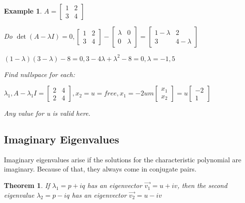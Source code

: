 \documentclass{article}
\newtheorem{theorem}{Theorem}
\newtheorem{example}{Example}
\begin{document}
\begin{example}
	$A=\begin{bmatrix}1&2\\3&4\end{bmatrix}$

	Do $\det(A-\lambda I)=0, \begin{bmatrix}1&2\\3&4\end{bmatrix}-\begin{bmatrix}\lambda&0\\0&\lambda\end{bmatrix}=
		\begin{bmatrix}1-\lambda&2\\3&4-\lambda\end{bmatrix}$

	$(1-\lambda)(3-\lambda)-8=0, 3-4\lambda+\lambda^2-8=0, \lambda=-1,5$

	Find nullspace for each:

		$\lambda_1, A-\lambda_1 I=\begin{bmatrix}2&4\\2&4\end{bmatrix}, x_2=u=free, x_1=-2um 
		\begin{bmatrix}x_1\\x_2\end{bmatrix}=u\begin{bmatrix}-2\\1\end{bmatrix}$

		Any value for u is valid here.
\end{example}

\subsection{Imaginary Eigenvalues}

Imaginary eigenvalues arise if the solutions for the characteristic polynomial are imaginary. Because of that, they always come in 
conjugate pairs.

\begin{theorem}
	If $\lambda_1=p+iq$ has an eigenvector $\vec{v_1}=u+iv$, then the second eigenvalue $\lambda_2=p-iq$ has an eigenvector 
	$\vec{v_2}=u-iv$
\end{theorem}
\end{document}
